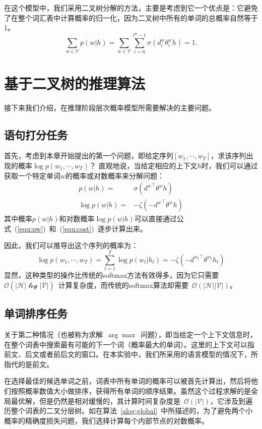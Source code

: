 在这个模型中，我们采用二叉树分解的方法，主要是考虑到它一个优点是：它避免了在整个词汇表中计算概率的归一化，因为二叉树中所有的单词的总概率自然等于1。
\begin{equation}
\sum_{w\in \mathcal{V}}{p(w|h)}=\sum_{w \in \mathcal{V}}\sum_{i=0}^{l^w-1}{\sigma(d_i^w\theta_{i}^w h)}=1.
\end{equation}



\section{基于二叉树的推理算法}
接下来我们介绍，在推理阶段层次概率模型所需要解决的主要问题。
\subsection{语句打分任务}
首先，考虑到本章开始提出的第一个问题，即给定序列$ [w_1,\cdots,w_T] $，求该序列出现的概率$   \log p(w_1,\cdots, w_T)$？ 直观地说，当给定相应的上下文$ h $时，我们可以通过获取一个特定单词$ w $的概率或对数概率来分解问题：
\begin{equation}
\begin{split}
    p(w|h) =&\sigma({d^w}^\top \theta^w h)\\
   \log p(w|h) =& -\zeta(- {d^{w}}^\top \theta^{w} h )
\end{split}
\end{equation}
其中概率$ p(w|h)$和对数概率$\log p(w | h)$可以直接通过公式~(\ref{equ:pw})~和~(\ref{equ:cost})~逐步计算出来。

因此，我们可以推导出这个序列的概率为：
\begin{equation}
   \log p(w_1,\cdots, w_T)=\sum_{t=1}^T\log p(w_t|h_t) = -\zeta(- {d^{w_t}}^\top \theta^{w_t} h_t )
\end{equation}
显然，这种类型的操作比传统的softmax方法有效得多，因为它只需要~$\mathcal{O}(\mathcal{|H|\log|V|})$~计算复杂度，而传统的softmax算法却需要~$\mathcal{O}(\mathcal{|H||V|})$。

\subsection{单词排序任务}
关于第二种情况（也被称为求解~$\arg\max$~问题），即当给定一个上下文信息时，在整个词表中搜索最有可能的下一个词（概率最大的单词）。这里的上下文可以指前文、后文或者前后文的窗口。在本实验中，我们所采用的语言模型的情况下，所指代的是前文。

在选择最佳的候选单词之前，词表中所有单词的概率可以被首先计算出，然后将他们按照概率数值大小做排序，获得所有单词的顺序结果。虽然这个过程求解的是全局最优解，但是仍然是相对缓慢的，其计算时间复杂度是~$\mathcal{O}(\mathcal{|V|})$，它涉及到遍历整个词表的二叉分层树。如在算法~\ref{alog:global}~中所描述的，为了避免两个小概率的精确度损失问题，我们选择计算每个内部节点的对数概率。


